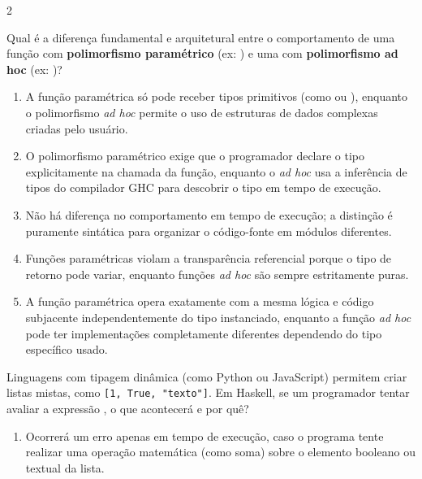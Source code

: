\documentclass[a4paper,10pt,brazil]{article}
\begin{document}
\begin{multicols}{2}
\begin{enumerate}
\end{enumerate}

Qual é a diferença fundamental e arquitetural entre o comportamento de uma função com \textbf{polimorfismo paramétrico} (ex: ) e uma com \textbf{polimorfismo ad hoc} (ex: )?

\begin{enumerate}
  \item A função paramétrica só pode receber tipos primitivos (como  ou ), enquanto o polimorfismo \emph{ad hoc} permite o uso de estruturas de dados complexas criadas pelo usuário.

  \item O polimorfismo paramétrico exige que o programador declare o tipo explicitamente na chamada da função, enquanto o \emph{ad hoc} usa a inferência de tipos do compilador GHC para descobrir o tipo em tempo de execução.

  \item Não há diferença no comportamento em tempo de execução; a distinção é puramente sintática para organizar o código-fonte em módulos diferentes.

  \item Funções paramétricas violam a transparência referencial porque o tipo de retorno pode variar, enquanto funções \emph{ad hoc} são sempre estritamente puras.

  \item A função paramétrica opera exatamente com a mesma lógica e código subjacente independentemente do tipo instanciado, enquanto a função \emph{ad hoc} pode ter implementações completamente diferentes dependendo do tipo específico usado.


\end{enumerate}

Linguagens com tipagem dinâmica (como Python ou JavaScript) permitem criar listas mistas, como \texttt{[1, True, "texto"]}. Em Haskell, se um programador tentar avaliar a expressão , o que acontecerá e por quê?

\begin{enumerate}
  \item Ocorrerá um erro apenas em tempo de execução, caso o programa tente realizar uma operação matemática (como soma) sobre o elemento booleano ou textual da lista.


\end{enumerate}
\end{multicols}
\end{document}
